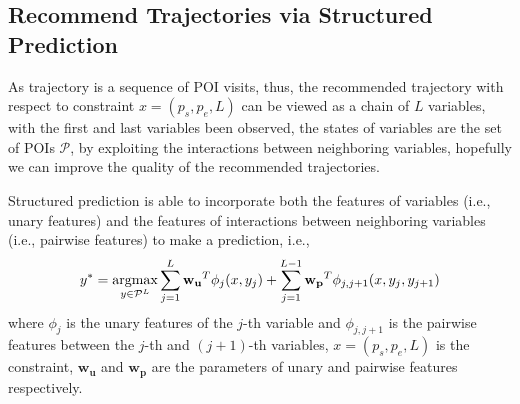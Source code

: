 \subsection{Recommend Trajectories via Structured \\ Prediction}
\label{method:structured}
As trajectory is a sequence of POI visits,
thus, the recommended trajectory with respect to constraint $x = (p_s, p_e, L)$
can be viewed as a chain of $L$ variables,
with the first and last variables been observed, the states of variables are the set of POIs $\mathcal{P}$,
by exploiting the interactions between neighboring variables,
hopefully we can improve the quality of the recommended trajectories.

Structured prediction is able to incorporate both the features of variables (i.e., unary features) and
the features of interactions between neighboring variables (i.e., pairwise features) to make a prediction, i.e.,
\begin{displaymath}
    y^* = \operatorname*{argmax}_{y \in \mathcal{P}^L} \sum_{j=1}^L \mathbf{w_u}^T \phi_j(x, y_j) +
                                        \sum_{j=1}^{L-1} \mathbf{w_p}^T \phi_{j, j+1}(x, y_j, y_{j+1})
\end{displaymath}
where $\phi_j$ is the unary features of the $j$-th variable and $\phi_{j, j+1}$ is the pairwise features between
the $j$-th and $(j+1)$-th variables, $x = (p_s, p_e, L)$ is the constraint, $\mathbf{w_u}$ and $\mathbf{w_p}$ are the
parameters of unary and pairwise features respectively.

